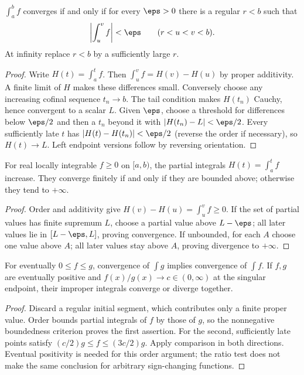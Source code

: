 \begin{theorem}
$\int_a^bf$ converges if and only if for every $\eps>0$ there is a
regular $r<b$ such that
\[\left|\int_u^vf\right|<\eps\qquad(r<u<v<b).
\]
At infinity replace $r<b$ by a sufficiently large $r$.
\end{theorem}
\begin{proof}
Write $H(t)=\int_a^tf$. Then $\int_u^vf=H(v)-H(u)$ by proper
additivity. A finite limit of $H$ makes these differences small.
Conversely choose any increasing cofinal sequence $t_n\to b$.
The tail condition makes $H(t_n)$ Cauchy, hence convergent to a scalar
$L$. Given $\eps$, choose a threshold for differences below $\eps/2$
and then a $t_n$ beyond it with $|H(t_n)-L|<\eps/2$. Every sufficiently
late $t$ has $|H(t)-H(t_n)|<\eps/2$ (reverse the order if necessary),
so $H(t)\to L$. Left endpoint versions follow by reversing orientation.
\end{proof}

\begin{theorem}
For real locally integrable $f\ge0$ on $[a,b)$, the partial integrals
$H(t)=\int_a^tf$ increase. They converge finitely if and only if they
are bounded above; otherwise they tend to $+\infty$.
\end{theorem}
\begin{proof}
Order and additivity give $H(v)-H(u)=\int_u^vf\ge0$.
If the set of partial values has finite supremum $L$, choose a partial
value above $L-\eps$; all later values lie in $[L-\eps,L]$, proving
convergence. If unbounded, for each $A$ choose one value above $A$;
all later values stay above $A$, proving divergence to $+\infty$.
\end{proof}

\begin{theorem}
For eventually $0\le f\le g$, convergence of $\int g$ implies
convergence of $\int f$. If $f,g$ are eventually positive and
$f(x)/g(x)\to c\in(0,\infty)$ at the singular endpoint, their
improper integrals converge or diverge together.
\end{theorem}
\begin{proof}
Discard a regular initial segment, which contributes only a finite proper
value. Order bounds partial integrals of $f$ by those of $g$, so the
nonnegative boundedness criterion proves the first assertion. For the
second, sufficiently late points satisfy
$(c/2)g\le f\le(3c/2)g$. Apply comparison in both directions.
Eventual positivity is needed for this order argument; the ratio test
does not make the same conclusion for arbitrary sign-changing functions.
\end{proof}

